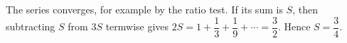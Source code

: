The series converges, for example by the ratio test. If its sum is $S$, then subtracting $S$ from $3S$ termwise gives $2S=1+\dfrac{1}{3}+\dfrac{1}{9}+\cdots=\dfrac{3}{2}$. Hence $\boxed{S=\dfrac{3}{4}}$.
